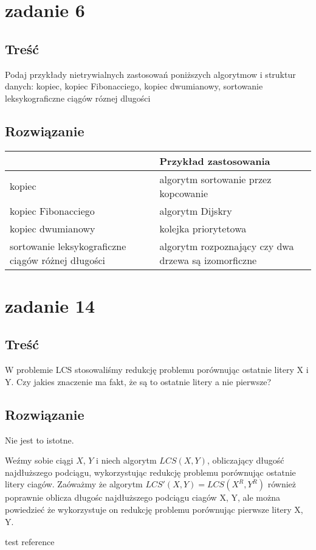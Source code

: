 \documentclass[svgnames]{report}
\begin{document}

\section{zadanie 6}
\subsection{Treść}
Podaj przykłady nietrywialnych zastosowań poniższych algorytmow i struktur danych:
kopiec, kopiec Fibonacciego, kopiec dwumianowy, sortowanie leksykograficzne ciągów róznej dlugości
\subsection{Rozwiązanie}
\begin{tabular}{l|l}
					&	Przykład zastosowania	\\	\hline
kopiec 				&	algorytm sortowanie przez kopcowanie	\\	\hline
kopiec Fibonacciego &	algorytm Dijskry	\\	\hline
kopiec dwumianowy 	&	kolejka priorytetowa	\\	\hline
sortowanie leksykograficzne ciągów różnej długości & algorytm rozpoznający czy dwa drzewa są izomorficzne	\\	\hline
\end{tabular}


\section{zadanie 14}
\subsection{Treść}
W problemie LCS stosowaliśmy redukcję problemu porównując ostatnie litery X i Y. Czy jakies znaczenie ma fakt, że są to ostatnie litery a nie pierwsze?
\subsection{Rozwiązanie}
Nie jest to istotne.

Weźmy sobie ciągi $X$, $Y$ i niech algorytm $LCS(X, Y)$, obliczający długość najdłuższego podciągu, wykorzystując redukcję problemu porównując ostatnie litery ciagów.
Zaóważmy że algorytm $LCS'(X, Y) = LCS(X^R, Y^R)$ również poprawnie oblicza długośc najdłuższego podciągu ciagów X, Y, ale można powiedzieć że wykorzystuje on redukcję problemu porównując pierwsze litery X, Y.



\begin{thebibliography}{99}
 test reference
\end{thebibliography}
\end{document}
